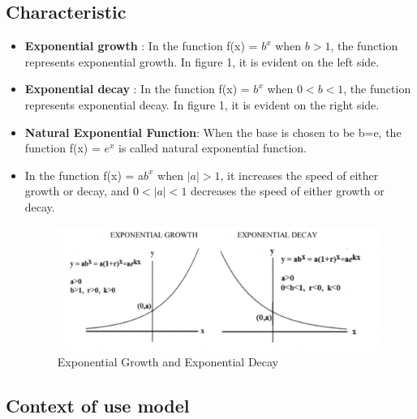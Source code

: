 \documentclass[a4paper,12pt]{report}
\begin{document}
\subsection{Characteristic}
\begin{itemize}


  \item \textbf{Exponential growth} : In the function  f(x) = $b^{x}$ when  $b > 1$, the function represents exponential growth. In figure 1, it is evident on the left side. \cite{b3}

  \item \textbf{Exponential decay} : In the function  f(x) = $b^{x}$ when  $0 < b < 1$, the function represents exponential decay. In figure 1, it is evident on the right side.\cite{b3}

   \item \textbf{Natural Exponential Function}: When the base is chosen to be b=e, the function f(x) = $e^x$ is called natural exponential function.\cite{b1}

   \item \textbf{} In the function f(x) = a$b^{x}$  when $|a| > 1$, it increases the speed of either growth or decay, and $0<|a|<1$ decreases the speed of either growth or decay.\cite{b2}

\begin{figure}[h]
\includegraphics[width=15cm]{ExponentialGrowthandDecay.png}
\caption{Exponential Growth and Exponential Decay}
\label{exp}
\end{figure}




\end{itemize}

\pagebreak
\subsection{Context of use model }
\end{document}
